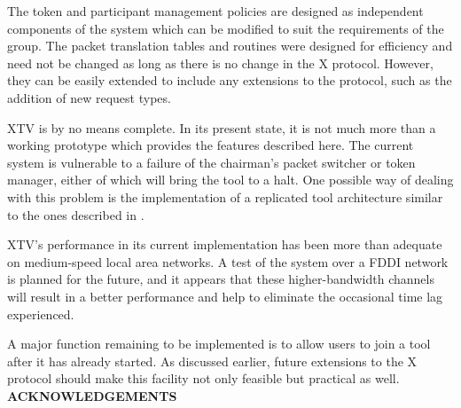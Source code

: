The token and participant management policies are designed as
independent components of the system which can be modified to suit the
requirements of the group.  The packet translation tables and routines
were designed for efficiency and need not be changed as long as there
is no change in the X protocol. However, they can be easily extended to
include any extensions to the protocol, such as the addition of new
request types.

XTV is by no means complete.  In its present state, it is not much more
than a working prototype which provides the features described here.
The current system is vulnerable to a failure of the chairman's packet
switcher or token manager, either of which will bring the tool to a
halt. 
One possible way of dealing with this problem is
the implementation of a replicated tool architecture similar to the
ones described in \cite{Abdel-Wahab88,Lantz86}.

XTV's performance in its current implementation
has been more than adequate on medium-speed local area networks.  A
test of the system over a FDDI network is planned for the future, and
it appears that these higher-bandwidth channels will result in a better
performance and help to eliminate the occasional time lag experienced.

A major function remaining to be implemented is to allow users
to join a tool after it has already started.  As discussed earlier,
future extensions to the X protocol should make this facility not only
feasible but practical as well.\\[1cm]

\noindent
{\large \bf ACKNOWLEDGEMENTS}\\

